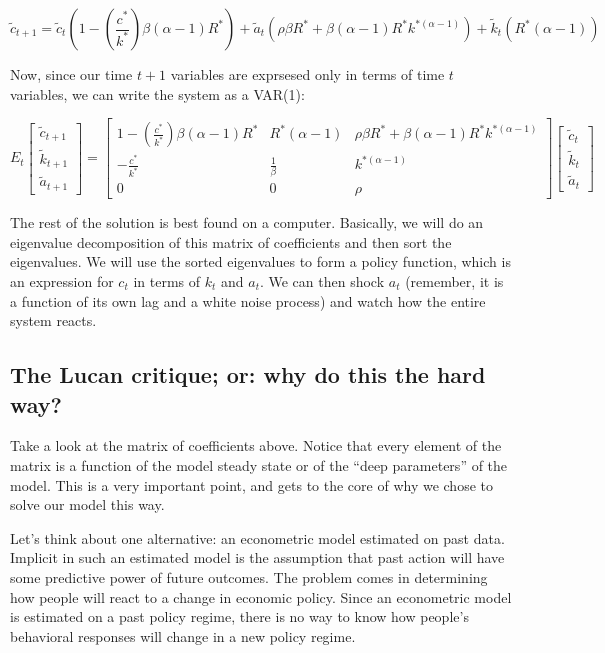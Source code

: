 \documentclass[12pt]{article}
\begin{document}
\begin{equation}
\tilde{c}_{t+1} = \tilde{c}_t \left( 1 - \left(\frac{c^*}{k^*}\right)\beta(\alpha-1)R^* \right) + \tilde{a}_t \left( \rho \beta R^* + \beta(\alpha-1)R^* k^{*(\alpha-1)} \right) + \tilde{k}_t \left( R^*(\alpha-1) \right)
\end{equation}

Now, since our time \(t+1\) variables are exprsesed only in terms of time \(t\) variables, we can write the system as a VAR(1):

\[ E_t \begin{bmatrix}
	\tilde{c}_{t+1} \\
	\tilde{k}_{t+1} \\
	\tilde{a}_{t+1}
 \end{bmatrix}  = 
\begin{bmatrix}
	1 - \left(\frac{c^*}{k^*}\right)\beta(\alpha-1)R^* & R^*(\alpha-1) & \rho \beta R^* + \beta(\alpha-1)R^* k^{*(\alpha-1)} \\
	-\frac{c^*}{k^*} & \frac{1}{\beta} & k^{*(\alpha-1)} \\
	0 & 0 & \rho
\end{bmatrix} 
\begin{bmatrix}
	\tilde{c}_{t} \\
	\tilde{k}_{t} \\
	\tilde{a}_{t}
 \end{bmatrix} \]

The rest of the solution is best found on a computer. Basically, we will do an eigenvalue decomposition of this matrix of coefficients and then sort the eigenvalues. We will use the sorted eigenvalues to form a policy function, which is an expression for \(c_t\) in terms of \(k_t\) and \(a_t\). We can then shock \(a_t\) (remember, it is a function of its own lag and a white noise process) and watch how the entire system reacts.

\subsection{The Lucan critique; or: why do this the hard way?}

Take a look at the matrix of coefficients above. Notice that every element of the matrix is a function of the model steady state or of the ``deep parameters'' of the model. This is a very important point, and gets to the core of why we chose to solve our model this way.

Let's think about one alternative: an econometric model estimated on past data. Implicit in such an estimated model is the assumption that past action will have some predictive power of future outcomes. The problem comes in determining how people will react to a change in economic policy. Since an econometric model is estimated on a past policy regime, there is no way to know how people's behavioral responses will change in a new policy regime.
\end{document}
